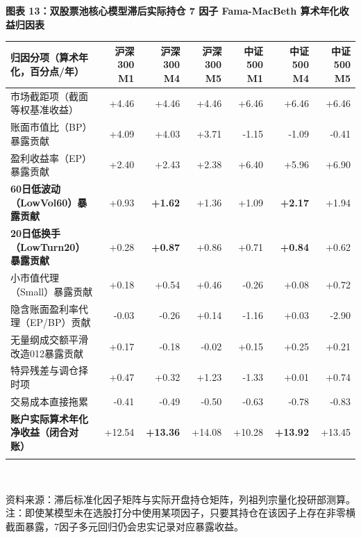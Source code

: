 \documentclass[12pt,a4paper]{article}
\newcommand{\exhibitcap}[1]{{\sffamily\bfseries\fontsize{9.6pt}{12.5pt}\selectfont\textcolor{Primary}{#1}}\\[2pt]}
\newcommand{\exhibitnote}[1]{{\fontsize{7.5pt}{10pt}\selectfont\color{GrayNote}#1\par}}
\begin{document}
\vspace{4pt}
\noindent\begin{minipage}{\textwidth}
\setlength{\parindent}{0pt}\setlength{\tabcolsep}{3.5pt}
\exhibitcap{图表 13：双股票池核心模型滞后实际持仓 7 因子 Fama-MacBeth 算术年化收益归因表}
\fontsize{7.7pt}{10.5pt}\selectfont
\begin{tabularx}{\textwidth}{@{}X r r r r r r@{}}
  \arrayrulecolor{Primary}\toprule[1.0pt]
  \rowcolor{TblHdr}
  \textbf{\sffamily 归因分项（算术年化，百分点/年）} & \textbf{\sffamily 沪深300 M1} & \textbf{\sffamily 沪深300 M4} & \textbf{\sffamily 沪深300 M5} & \textbf{\sffamily 中证500 M1} & \textbf{\sffamily 中证500 M4} & \textbf{\sffamily 中证500 M5} \\
  \midrule[0.5pt]
    市场截距项（截面等权基准收益） & +4.46 & +4.46 & +4.46 & +6.46 & +6.46 & +6.46 \\
    账面市值比（BP）暴露贡献 & +4.09 & +4.03 & +3.71 & -1.15 & -1.09 & -0.41 \\
    盈利收益率（EP）暴露贡献 & +2.40 & +2.43 & +2.38 & +6.40 & +5.96 & +6.90 \\
    \textbf{60日低波动（LowVol60）暴露贡献} & +0.93 & \textbf{\textcolor{Primary}{+1.62}} & +1.36 & +1.09 & \textbf{\textcolor{Primary}{+2.17}} & +1.94 \\
    \textbf{20日低换手（LowTurn20）暴露贡献} & +0.28 & \textbf{\textcolor{Primary}{+0.87}} & +0.86 & +0.71 & \textbf{\textcolor{Primary}{+0.84}} & +0.62 \\
    小市值代理（Small）暴露贡献 & +0.18 & +0.54 & +0.46 & -0.26 & +0.08 & +0.72 \\
    隐含账面盈利率代理（EP/BP）贡献 & -0.03 & -0.26 & +0.14 & -1.16 & +0.03 & -2.90 \\
    无量纲成交额平滑改造012暴露贡献 & +0.17 & -0.18 & -0.02 & +0.15 & +0.25 & +0.21 \\
    特异残差与调仓择时项 & +0.47 & +0.32 & +1.23 & -1.33 & +0.01 & +0.74 \\
    交易成本直接拖累 & -0.41 & -0.49 & -0.50 & -0.63 & -0.78 & -0.83 \\
    \arrayrulecolor{RuleMuted}\midrule[0.4pt]
    \textbf{账户实际算术年化净收益（闭合对账）} & +12.54 & \textbf{\textcolor{Primary}{+13.36}} & +14.08 & +10.28 & \textbf{\textcolor{Primary}{+13.92}} & +13.45 \\
  \arrayrulecolor{Primary}\bottomrule[1.0pt]
\end{tabularx}\\[3pt]
\exhibitnote{资料来源：滞后标准化因子矩阵与实际开盘持仓矩阵，列祖列宗量化投研部测算。注：即使某模型未在选股打分中使用某项因子，只要其持仓在该因子上存在非零横截面暴露，7因子多元回归仍会忠实记录对应暴露收益。}
\end{minipage}
\vspace{5pt}
\end{document}
